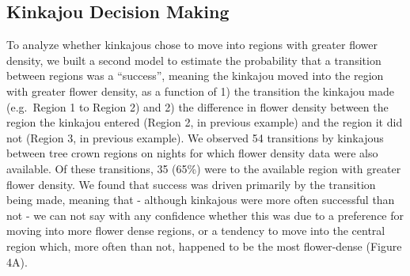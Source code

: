 \documentclass[twoside,12pt,final]{ucthesis-CA2012}
\begin{document}
\begin{ucmainmatter}
\begin{figure}
\end{figure}
\hypertarget{kinkajou-decision-making-1}{%
\subsection{Kinkajou Decision Making}\label{kinkajou-decision-making-1}}

To analyze whether kinkajous chose to move into regions with greater flower density, we built a second model to estimate the probability that a transition between regions was a ``success'', meaning the kinkajou moved into the region with greater flower density, as a function of 1) the transition the kinkajou made (e.g.~Region 1 to Region 2) and 2) the difference in flower density between the region the kinkajou entered (Region 2, in previous example) and the region it did not (Region 3, in previous example). We observed 54 transitions by kinkajous between tree crown regions on nights for which flower density data were also available. Of these transitions, 35 (65\%) were to the available region with greater flower density. We found that success was driven primarily by the transition being made, meaning that - although kinkajous were more often successful than not - we can not say with any confidence whether this was due to a preference for moving into more flower dense regions, or a tendency to move into the central region which, more often than not, happened to be the most flower-dense (Figure 4A).


\end{ucmainmatter}
\end{document}
